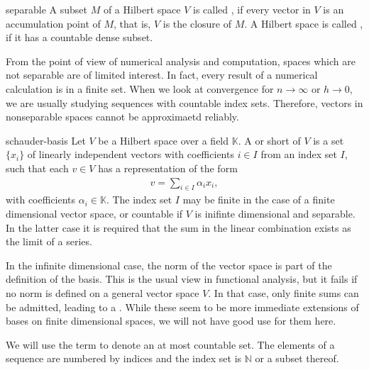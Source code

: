 \begin{Definition}{separable}
  A subset $M$ of a Hilbert space $V$ is called , if
  every vector in $V$ is an accumulation point of $M$, that is, $V$ is
  the closure of $M$.  A Hilbert space is called ,
  if it has a countable dense subset.
\end{Definition}

\begin{note}
  From the point of view of numerical analysis and computation, spaces
  which are not separable are of limited interest. In fact, every
  result of a numerical calculation is in a finite set. When we look
  at convergence for $n\to\infty$ or $h\to 0$, we are usually studying
  sequences with countable index sets. Therefore, vectors in
  nonseparable spaces cannot be approximaetd reliably.
\end{note}

\begin{Definition}{schauder-basis}
  Let $V$ be a Hilbert space over a field $\mathbb K$. A
   or short  of $V$ is a set
  $\{x_i\}$ of linearly independent vectors with coefficients $i\in I$
  from an index set $I$, such that each $v\in V$ has a representation
  of the form
  \begin{gather*}
    v = \sum_{i\in I} \alpha_i x_i,
  \end{gather*}
  with coefficients $\alpha_i \in \mathbb K$. The index set $I$ may be
  finite in the case of a finite dimensional vector space, or
  countable if $V$ is inifinte dimensional and separable. In the
  latter case it is required that the sum in the linear combination
  exists as the limit of a series.
\end{Definition}

\begin{remark}
  In the infinite dimensional case, the norm of the vector space is
  part of the definition of the basis. This is the usual view in
  functional analysis, but it fails if no norm is defined on a general
  vector space $V$. In that case, only finite sums can be admitted,
  leading to a . While these seem to be more
  immediate extensions of bases on finite dimensional spaces, we will
  not have good use for them here.
\end{remark}

\begin{notation}
  We will use the term  to denote an at most
  countable set. The elements of a sequence are numbered by indices
  and the index set is $\mathbb N$ or a subset thereof.
\end{notation}

